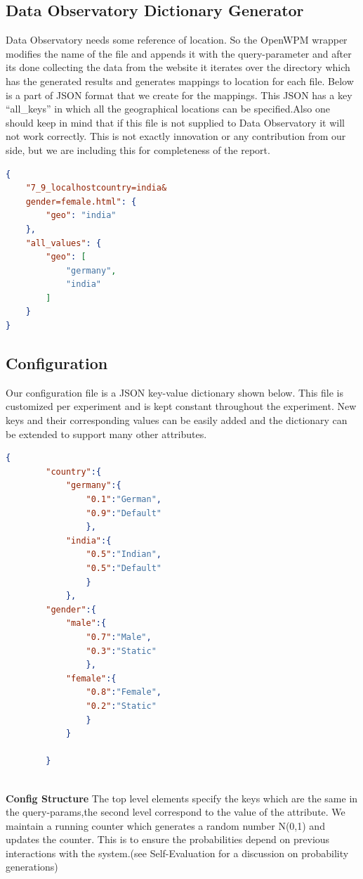 \documentclass[fleqn,12pt]{SelfArx} %
\newcommand{\quotes}[1]{``#1''}
\begin{document}
\subsection{Data Observatory Dictionary Generator}
Data Observatory needs some reference of location. So the OpenWPM wrapper modifies the name of the file and appends it with the query-parameter and after its done collecting the data from the website it iterates over the directory which has the generated results and generates mappings to location for each file.  Below is a part of JSON format that we create for the mappings. This JSON has a key \quotes {all\_keys} in which all the geographical locations can be specified.Also one should keep in mind that if this file is not supplied to Data Observatory it will not work correctly. This is not exactly innovation or any contribution from our side, but we are including this for completeness of the report.  
\begin{lstlisting}[language=json,firstnumber=1]
{
	"7_9_localhostcountry=india&
    gender=female.html": {
		"geo": "india"
	},
	"all_values": {
		"geo": [
			"germany",
			"india"
		]
	}
}
\end{lstlisting}
\subsection{Configuration}
Our configuration file is a JSON key-value dictionary shown below. This file is customized per experiment and is kept constant throughout the experiment. New keys and their corresponding values can be easily added and the dictionary can be extended to support many other attributes.
\begin{lstlisting}[language=json,firstnumber=1]
   {
        "country":{
            "germany":{
                "0.1":"German",
                "0.9":"Default"
                },
            "india":{
                "0.5":"Indian",
                "0.5":"Default"
                }
            },
        "gender":{
            "male":{
                "0.7":"Male",
                "0.3":"Static"
                },
            "female":{
                "0.8":"Female",
                "0.2":"Static"
                }
            }

        }
       
\end{lstlisting}
\textbf{Config Structure}
The top level elements specify the keys which are the same in the query-params,the second level correspond to the value of the attribute. We maintain a running counter which generates a random number N(0,1) and updates the counter. This is to ensure the probabilities depend on previous interactions with the system.(see Self-Evaluation for a discussion on probability generations)
\end{document}
